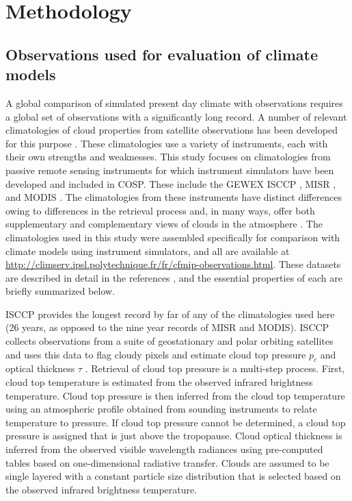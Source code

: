 \chapter{Methodology}

\section{Observations used for evaluation of climate models}
A global comparison of simulated present day climate with observations requires a global set of observations with a significantly long record. A number of relevant climatologies of cloud properties from satellite observations has been developed for this purpose \citep{stubenrauch_et_al_2009}. These climatologies use a variety of instruments, each with their own strengths and weaknesses. This study focuses on climatologies from passive remote sensing instruments for which instrument simulators have been developed and included in COSP. These include the GEWEX ISCCP \citep{rossow_and_schiffer_1999}, MISR \citep{diner_et_al_1998,diner_et_al_2002,diner_et_al_2005}, and MODIS \citep{king_et_al_2003}. The climatologies from these instruments have distinct differences owing to differences in the retrieval process and, in many ways, offer both supplementary and complementary views of clouds in the atmosphere \citep{marchand_et_al_2010,pincus_et_al_2011}. The climatologies used in this study were assembled specifically for comparison with climate models using instrument simulators, and all are available at \url{http://climserv.ipsl.polytechnique.fr/fr/cfmip-observations.html}. These datasets are described in detail in the references \citep{marchand_et_al_2010,pincus_et_al_2011}, and the essential properties of each are briefly summarized below.

ISCCP provides the longest record by far of any of the climatologies used here (26 years, as opposed to the nine year records of MISR and MODIS). ISCCP collects observations from a suite of geostationary and polar orbiting satellites and uses this data to flag cloudy pixels and estimate cloud top pressure $p_c$ and optical thickness $\tau$ \citep{rossow_and_schiffer_1999}. Retrieval of cloud top pressure is a multi-step process. First, cloud top temperature is estimated from the observed infrared brightness temperature. Cloud top pressure is then inferred from the cloud top temperature using an atmospheric profile obtained from sounding instruments to relate temperature to pressure. If cloud top pressure cannot be determined, a cloud top pressure is assigned that is just above the tropopause. Cloud optical thickness is inferred from the observed visible wavelength radiances using pre-computed tables based on one-dimensional radiative transfer. Clouds are assumed to be single layered with a constant particle size distribution that is selected based on the observed infrared brightness temperature.

